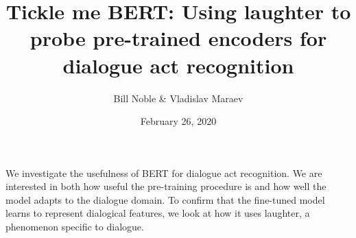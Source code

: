 \documentclass[11pt,a4paper]{article}
\title{Tickle me BERT: Using laughter to probe pre-trained encoders for dialogue act recognition}
\date{February 26, 2020}
\author{Bill Noble \& Vladislav Maraev}
\begin{document}
\maketitle
{}

We investigate the usefulness of BERT for dialogue act recognition.
We are interested in both how useful the pre-training procedure is and 
how well the model adapts to the dialogue domain.
To confirm that the fine-tuned model learns to represent dialogical features, 
we look at how it uses laughter, a phenomenon specific to dialogue.
\end{document}
